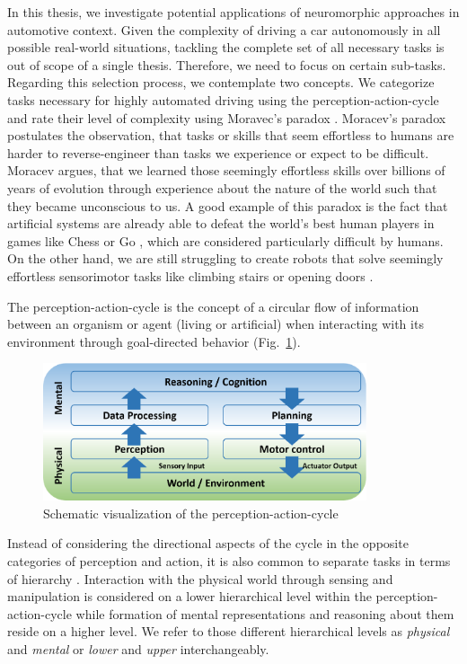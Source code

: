 In this thesis, we investigate potential applications of neuromorphic approaches in automotive context.
Given the complexity of driving a car autonomously in all possible real-world situations, tackling the complete set of all necessary tasks is out of scope of a single thesis.
Therefore, we need to focus on certain sub-tasks.
Regarding this selection process, we contemplate two concepts.
We categorize tasks necessary for highly automated driving using the perception-action-cycle and rate their level of complexity using Moravec's paradox \parencite{Moravec1988}.
Moracev's paradox postulates the observation, that tasks or skills that seem effortless to humans are harder to reverse-engineer than tasks we experience or expect to be difficult.
Moracev argues, that we learned those seemingly effortless skills over billions of years of evolution through experience about the nature of the world such that they became unconscious to us.
A good example of this paradox is the fact that artificial systems are already able to defeat the world's best human players in games like Chess \parencite{Hsu2002} or Go \parencite{Silver2016}, which are considered particularly difficult by humans.
On the other hand, we are still struggling to create robots that solve seemingly effortless sensorimotor tasks like climbing stairs or opening doors \parencite{Guizzo2015, Norton2017}.

The perception-action-cycle \parencite{Fuster2004} is the concept of a circular flow of information between an organism or agent (living or artificial) when interacting with its environment through goal-directed behavior (Fig.~\ref{fig:perc-act-cicle}).
\begin{figure}[t!]
	\centering
	\includegraphics[width=0.85\textwidth]{imgs/ActionPerceptionCycle.eps}
	\caption{Schematic visualization of the perception-action-cycle}
	\label{fig:perc-act-cicle}
\end{figure}
Instead of considering the directional aspects of the cycle in the opposite categories of perception and action, it is also common to separate tasks in terms of hierarchy \parencite{Loeb2014}.
Interaction with the physical world through sensing and manipulation is considered on a lower hierarchical level within the perception-action-cycle while formation of mental representations and reasoning about them reside on a higher level.
We refer to those different hierarchical levels as \emph{physical} and \emph{mental} or \emph{lower} and \emph{upper} interchangeably.

